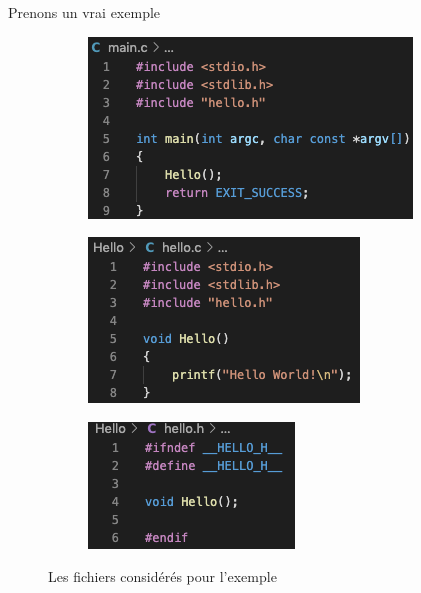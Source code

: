 \documentclass[10pt,xcolor=dvipsnames]{beamer}
\begin{document}
\begin{frame}{Prenons un vrai exemple}
    \begin{figure}
\centering
    \begin{subfigure}[b]{0.32\textwidth}
        \includegraphics[width=\textwidth]{figures/hello_main.png}
        \label{fig:nature1}
    \end{subfigure}
    \begin{subfigure}[b]{0.32\textwidth}
        \includegraphics[width=\textwidth]{figures/hello_c.png}
        \label{fig:nature2}
    \end{subfigure}
    \begin{subfigure}[b]{0.32\textwidth}
        \includegraphics[width=\textwidth]{figures/hello_h.png}
        \label{fig:nature3}
    \end{subfigure}
\caption{Les fichiers considérés pour l'exemple}
\label{fig:images}
\end{figure}
\end{frame}
\end{document}
